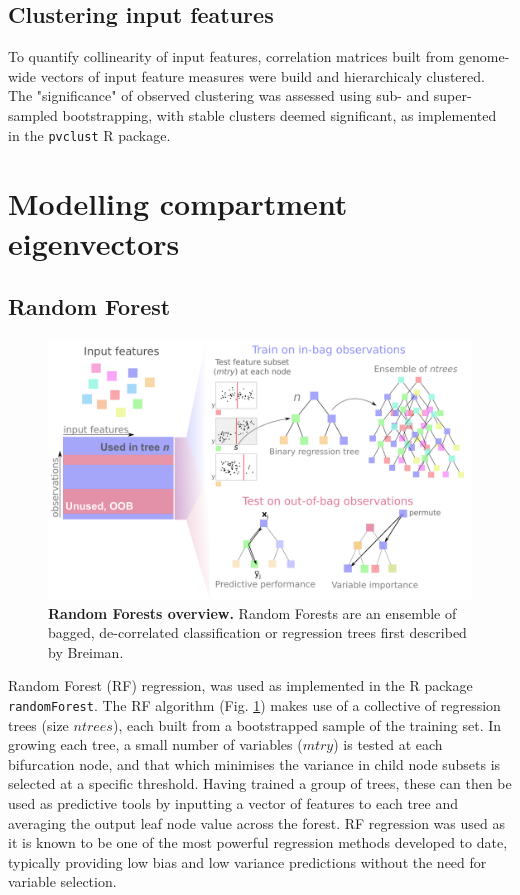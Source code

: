 \documentclass[a4paper,11pt,oneside]{book}
\begin{document}
\subsection{Clustering input features}

To quantify collinearity of input features, correlation matrices built from genome-wide vectors of input feature measures were build and hierarchicaly clustered. The "significance" of observed clustering was assessed using sub- and super-sampled bootstrapping, with stable clusters deemed significant, as implemented in the \texttt{pvclust} R package.\cite{Suzuki2006a}

\section{Modelling compartment eigenvectors}\label{modelling}

\subsection{Random Forest}\label{sec:rf}

\begin{figure}
\begin{center}
\includegraphics[width=4.5in]{figs/randforests.pdf}
\captionsetup{width=\textwidth}
\caption[Random Forests overview.]{ {\bf Random Forests overview. } 
 Random Forests are an ensemble of bagged, de-correlated classification or regression trees first described by Breiman.\cite{Breiman2001a}
}\label{fig:randforests}
\end{center}
\end{figure} 

Random Forest (RF) regression,\cite{Breiman2001a}  was used
as implemented in the R package \texttt{randomForest}.\cite{Liaw2002}
The RF algorithm (Fig. \ref{fig:randforests}) makes use of a collective of regression trees (size $ntrees$), each built from a
bootstrapped sample of the training set. In growing each tree, a small
number of variables ($mtry$) is tested at each bifurcation node, and that which minimises the
variance in child node subsets is selected at a specific
threshold. Having trained a group of trees, these can then be used as
predictive tools by inputting a vector of features to each tree and
averaging the output leaf node value across the forest. RF regression
was used as it is known to be one of the most powerful regression
methods developed to date,\cite{Svetnik2003, Cutler2007} typically
providing low bias and low variance predictions without the need for
variable selection.\cite{Diaz2006, Dasgupta2012}
\end{document}
